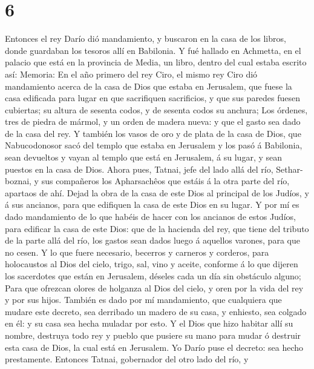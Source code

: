 \hypertarget{section-5}{%
\section{6}\label{section-5}}

 Entonces el rey Darío dió mandamiento, y buscaron en la
casa de los libros, donde guardaban los tesoros allí en Babilonia.
 Y fué hallado en Achmetta, en el palacio que está en la
provincia de Media, un libro, dentro del cual estaba escrito así:
Memoria:  En el año primero del rey Ciro, el mismo rey Ciro
dió mandamiento acerca de la casa de Dios que estaba en Jerusalem, que
fuese la casa edificada para lugar en que sacrifiquen sacrificios, y que
sus paredes fuesen cubiertas; su altura de sesenta codos, y de sesenta
codos su anchura;  Los órdenes, tres de piedra de mármol, y
un orden de madera nueva: y que el gasto sea dado de la casa del rey.
 Y también los vasos de oro y de plata de la casa de Dios,
que Nabucodonosor sacó del templo que estaba en Jerusalem y los pasó á
Babilonia, sean devueltos y vayan al templo que está en Jerusalem, á su
lugar, y sean puestos en la casa de Dios.  Ahora pues,
Tatnai, jefe del lado allá del río, Sethar-boznai, y sus compañeros los
Apharsachêos que estáis á la otra parte del río, apartaos de ahí.
 Dejad la obra de la casa de este Dios al principal de los
Judíos, y á sus ancianos, para que edifiquen la casa de este Dios en su
lugar.  Y por mí es dado mandamiento de lo que habéis de
hacer con los ancianos de estos Judíos, para edificar la casa de este
Dios: que de la hacienda del rey, que tiene del tributo de la parte allá
del río, los gastos sean dados luego á aquellos varones, para que no
cesen.  Y lo que fuere necesario, becerros y carneros y
corderos, para holocaustos al Dios del cielo, trigo, sal, vino y aceite,
conforme á lo que dijeren los sacerdotes que están en Jerusalem, déseles
cada un día sin obstáculo alguno;  Para que ofrezcan olores
de holganza al Dios del cielo, y oren por la vida del rey y por sus
hijos.  También es dado por mí mandamiento, que cualquiera
que mudare este decreto, sea derribado un madero de su casa, y enhiesto,
sea colgado en él: y su casa sea hecha muladar por esto.  Y
el Dios que hizo habitar allí su nombre, destruya todo rey y pueblo que
pusiere su mano para mudar ó destruir esta casa de Dios, la cual está en
Jerusalem. Yo Darío puse el decreto: sea hecho prestamente.
 Entonces Tatnai, gobernador del otro lado del río, y
